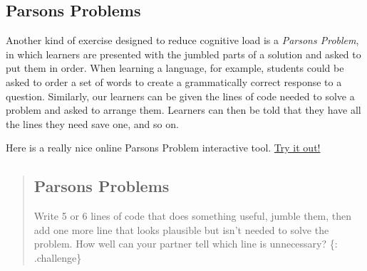 \subsection{Parsons Problems}\label{parsons-problems}

Another kind of exercise designed to reduce cognitive load is a
\emph{Parsons Problem}, in which learners are presented with the jumbled
parts of a solution and asked to put them in order. When learning a
language, for example, students could be asked to order a set of words
to create a grammatically correct response to a question. Similarly, our
learners can be given the lines of code needed to solve a problem and
asked to arrange them. Learners can then be told that they have all the
lines they need save one, and so on.

Here is a really nice online Parsons Problem interactive tool.
\href{http://runestoneinteractive.org/LearningAtScale/parsons.html}{Try
it out!}

\begin{quote}
\subsection{Parsons Problems}\label{parsons-problems-1}

Write 5 or 6 lines of code that does something useful, jumble them, then
add one more line that looks plausible but isn't needed to solve the
problem. How well can your partner tell which line is unnecessary? \{:
.challenge\}
\end{quote}
